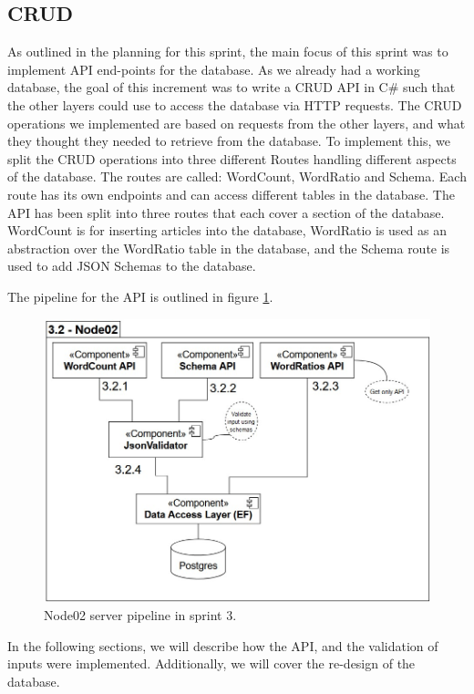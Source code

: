 \subsection{CRUD}

As outlined in the planning for this sprint, the main focus of this sprint was to implement API end-points for the database.
As we already had a working database, the goal of this increment was to write a CRUD API in C\# such that the other layers could use to access the database via HTTP requests.
The CRUD operations we implemented are based on requests from the other layers, and what they thought they needed to retrieve from the database.
To implement this, we split the CRUD operations into three different Routes handling different aspects of the database. The routes are called: WordCount, WordRatio and Schema. Each route has its own endpoints and can access different tables in the database. The API has been split into three routes that each cover a section of the database. WordCount is for inserting articles into the database, WordRatio is used as an abstraction over the WordRatio table in the database, and the Schema route is used to add JSON Schemas to the database.

The pipeline for the API is outlined in figure \ref{Node02Sprint3}.

\begin{figure}[h]
    \centering
    \includegraphics[width=\linewidth]{Images/Node02Pipeline.jpg}
    \caption{Node02 server pipeline in sprint 3.}
    \label{Node02Sprint3}
\end{figure}

In the following sections, we will describe how the API, and the validation of inputs were implemented. Additionally, we will cover the re-design of the database.

